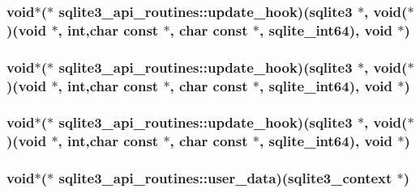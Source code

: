 \subsubsection{\setlength{\rightskip}{0pt plus 5cm}void$\ast$($\ast$ \bf{sqlite3\_\-api\_\-routines::update\_\-hook})(\bf{sqlite3} $\ast$, void($\ast$)(void $\ast$, int,char const $\ast$, char const $\ast$, \bf{sqlite\_\-int64}), void $\ast$)}\label{structsqlite3__api__routines_f43e600ad749ada9e85b9dab1ec33410}


\subsubsection{\setlength{\rightskip}{0pt plus 5cm}void$\ast$($\ast$ \bf{sqlite3\_\-api\_\-routines::update\_\-hook})(\bf{sqlite3} $\ast$, void($\ast$)(void $\ast$, int,char const $\ast$, char const $\ast$, \bf{sqlite\_\-int64}), void $\ast$)}\label{structsqlite3__api__routines_f43e600ad749ada9e85b9dab1ec33410}


\subsubsection{\setlength{\rightskip}{0pt plus 5cm}void$\ast$($\ast$ \bf{sqlite3\_\-api\_\-routines::update\_\-hook})(\bf{sqlite3} $\ast$, void($\ast$)(void $\ast$, int,char const $\ast$, char const $\ast$, \bf{sqlite\_\-int64}), void $\ast$)}\label{structsqlite3__api__routines_f43e600ad749ada9e85b9dab1ec33410}


\subsubsection{\setlength{\rightskip}{0pt plus 5cm}void$\ast$($\ast$ \bf{sqlite3\_\-api\_\-routines::user\_\-data})(\bf{sqlite3\_\-context} $\ast$)}\label{structsqlite3__api__routines_77b6fd99c4a2ff250b7176f740e460b7}


